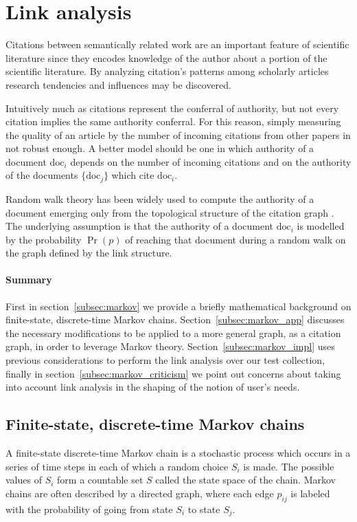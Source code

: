\section{\label{sec:link_analysis}Link analysis}
Citations between semantically related work are an important feature of scientific literature since they encodes knowledge of the author about a portion of the scientific literature. By analyzing citation's patterns among scholarly articles research tendencies and influences may be discovered.

Intuitively much as citations represent the conferral of authority, but not every citation implies the same authority conferral. For this reason, simply measuring the quality of an article by the number of incoming citations from other papers in not robust enough. A better model should be one in which authority of a document $\mbox{doc}_i$ depends on the number of incoming citations and on the authority of the documents $\{\mbox{doc}_j\}$ which cite $\mbox{doc}_i$. 

Random walk theory has been widely used to compute the authority of a document emerging only from the topological structure of the citation graph \cite{chakrabarti2003mwd, manning2008iir}. The underlying assumption is that the authority of a document $\mbox{doc}_i$ is modelled by the probability $\Pr(p)$ of reaching that document during a random walk on the graph defined by the link structure.

\paragraph{Summary} First in section~\ref{subsec:markov} we provide a briefly mathematical background on finite-state, discrete-time Markov chains. Section~\ref{subsec:markov_app} discusses the necessary modifications to be applied to a more general graph, as a citation graph, in order to leverage Markov theory. Section~\ref{subsec:markov_impl} uses previous considerations to perform the link analysis over our test collection, finally in section~\ref{subsec:markov_criticism} we point out concerns about taking into account link analysis in the shaping of the notion of user's needs.

\subsection{\label{subsec:markov}Finite-state, discrete-time Markov chains}
A finite-state discrete-time Markov chain is a stochastic process which occurs in a series of time steps in each of which a random choice $S_i$ is made. The possible values of $S_i$ form a countable set $S$ called the state space of the chain. Markov chains are often described by a directed graph, where each edge $p_{ij}$ is labeled with the probability of going from state $S_i$ to state $S_j$.
